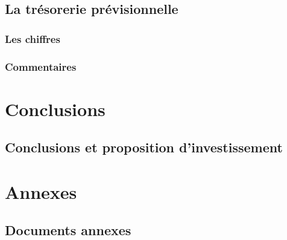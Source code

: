 \documentclass[a4paper]{report}
\begin{document}
\section{La trésorerie prévisionnelle}

\subsection{Les chiffres}

\subsection{Commentaires}

\chapter{Conclusions}

\section{Conclusions et proposition d'investissement}

\chapter{Annexes}

\section{Documents annexes}
\end{document}
